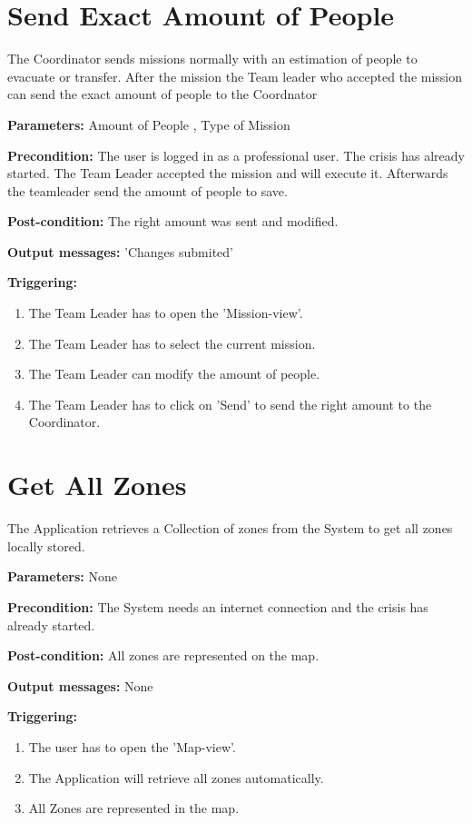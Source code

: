 \section{Send Exact Amount of People}
\label{operation:ExactAmount}
The Coordinator sends missions normally with an estimation of people to
evacuate or transfer. After the mission the Team leader who accepted the
mission can send the exact amount of people to the Coordnator\\
\begin{description}
\item \textbf{Parameters:} Amount of People , Type of Mission
\item \textbf{Precondition:} The user is logged in as a professional user. The
crisis has already started. The Team Leader accepted the mission and will
execute it. Afterwards the teamleader send the amount of people to save.
\item \textbf{Post-condition:} The right amount was sent and modified.
\item \textbf{Output messages:} 'Changes submited'
\item \textbf{Triggering:}
\begin{enumerate}
\item The Team Leader has to open the 'Mission-view'.
\item The Team Leader has to select the current mission.
\item The Team Leader can modify the amount of people.
\item The Team Leader has to click on 'Send' to send the right amount to the
Coordinator.
\end{enumerate}
\end{description}   

\section{Get All Zones}
\label{operation:Get All Zones}
The Application retrieves a Collection of zones from the System to get all zones
locally stored.
\begin{description}
\item \textbf{Parameters:} None
\item \textbf{Precondition:} The System needs an internet connection and the
crisis has already started.
\item \textbf{Post-condition:} All zones are represented on the map.
\item \textbf{Output messages:} None
\item \textbf{Triggering:}
\begin{enumerate}
\item The user has to open the 'Map-view'.
\item The Application will retrieve all zones automatically.
\item All Zones are represented in the map.
\end{enumerate}
\end{description}  

